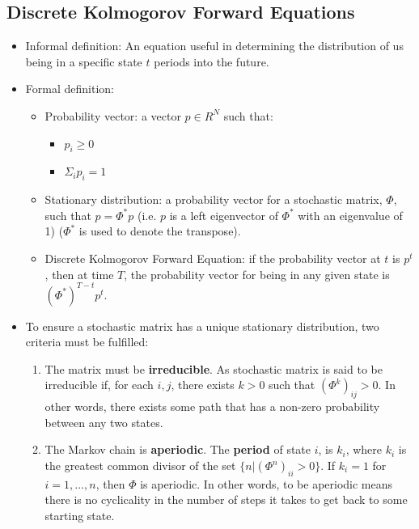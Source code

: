 \documentclass{article}
\begin{document}
\subsection{Discrete Kolmogorov Forward Equations}
\begin{itemize}
    \item Informal definition: An equation useful in determining the distribution
    of us being in a specific state $ t $ periods into the future. 
    \item Formal definition: 
    \begin{itemize}
        \item Probability vector: a vector $ p \in R^N $ such that:
        \begin{itemize}
            \item $ p_i \ge 0 $
            \item $ \Sigma_i p_i = 1 $
        \end{itemize}
        \item Stationary distribution: a probability vector for a stochastic
        matrix, $ \Phi $, such that $ p = \Phi^* p $ (i.e. $ p $ is a left
        eigenvector of $ \Phi^* $ with an eigenvalue of 1) ($ \Phi^* $ is used 
        to denote the transpose).
        \item Discrete Kolmogorov Forward Equation: if the probability vector at
        $ t $ is $ p^t $, then at time $ T $, the probability vector for being
        in any given state is $ {(\Phi^*)}^{T-t}p^t $.
    \end{itemize}
    \item To ensure a stochastic matrix has a unique stationary distribution, 
    two criteria must be fulfilled:
    \begin{enumerate}
        \item The matrix must be \textbf{irreducible}. As stochastic matrix is said to be 
        irreducible if, for each $ i,j $, there exists $ k > 0 $ such that $ 
        {(\Phi^k)}_{ij} > 0$. In other words, there exists some path that has a 
        non-zero probability between any two states.
        \item The Markov chain is \textbf{aperiodic}. The \textbf{period} of 
        state $ i $, is $ k_i $, where $ k_i $ is the greatest common divisor of 
        the set $ \{n | {(\Phi^n)}_{ii} > 0\} $. If $ k_i = 1 $ for $ i = 1, 
        \dots, n $, then $ \Phi $ is aperiodic. In other words, to be aperiodic 
        means there is no cyclicality in the number of steps it takes to get 
        back to some starting state. 

\end{enumerate}
\end{itemize}
\end{document}
